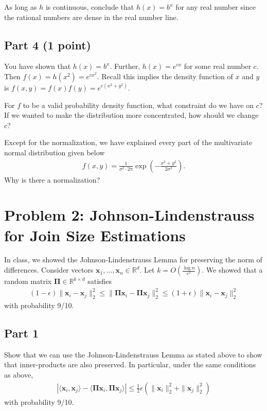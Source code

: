\documentclass{article}
\begin{document}
As long as $h$ is continuous, conclude that $h(x) = b^x$ for any real number since the rational numbers are dense in the real number line.

\subsection*{Part 4 (1 point)}

You have shown that $h(x) = b^x$. Further, $h(x) = e^{cx}$ for some real number $c$.
Then $f(x) = h(x^2) = e^{c x^2}$.
Recall this implies the density function of $x$ and $y$ is $f(x,y) = f(x) f(y) = e^{c (x^2 + y^2)}$.

For $f$ to be a valid probability density function, what constraint do we have on $c$?
If we wanted to make the distribution more concentrated, how should we change $c$?

Except for the normalization, we have explained every part of the multivariate normal distribution given below
\begin{align*}
f(x,y) = \frac1{\sigma^2 \cdot 2 \pi} \exp\left(-\frac{x^2 + y^2}{2\sigma^2}\right).
\end{align*}
Why is there a normalization?

%

\newpage

\section*{Problem 2: Johnson-Lindenstrauss for Join Size Estimations}

In class, we showed the Johnson-Lindenstrauss Lemma for preserving the norm of differences.
Consider vectors $\mathbf{x}_1, \ldots, \mathbf{x}_n \in \mathbb{R}^d$.
Let $k = O\left( \frac{\log n}{\epsilon^2} \right)$.
We showed that a random matrix $\mathbf{\Pi} \in \mathbb{R}^{k \times d}$ satisfies
\begin{align}
(1-\epsilon) \| \mathbf{x}_i - \mathbf{x}_j \|_2^2
\leq \| \mathbf{\Pi x}_i - \mathbf{\Pi x}_j \|_2^2
\leq (1+\epsilon) \| \mathbf{x}_i - \mathbf{x}_j \|_2^2
\end{align}
with probability 9/10.

\subsection*{Part 1}
Show that we can use the Johnson-Lindenstrauss Lemma as stated above to show that inner-products are also preserved.
In particular, under the same conditions as above,
\begin{align}
|
\langle \mathbf{x}_i, \mathbf{x}_j \rangle
- \langle \mathbf{\Pi x}_i, \mathbf{\Pi x}_j \rangle
|
\leq \frac12 \epsilon (\|\mathbf{x}_i\|_2^2 + \|\mathbf{x}_j\|_2^2)
\end{align}
with probability 9/10.
\end{document}

